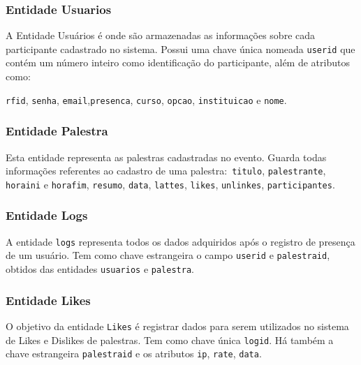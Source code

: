 \documentclass[tcc,capa]{texufpel}
\begin{document}
        \subsubsection{Entidade Usuarios}
        
            A Entidade Usuários é onde são armazenadas as informações sobre cada participante cadastrado no sistema. Possui uma chave única nomeada \texttt{user\underline{\hspace{.10in}}id} que contém um número inteiro como identificação do participante, além de atributos como:

            \texttt{rfid},
            \texttt{senha}, \texttt{email},\texttt{presenca},
            \texttt{curso}, \texttt{opcao}, \texttt{instituicao} e \texttt{nome}.

        
        \subsubsection{Entidade Palestra}
        
            Esta entidade representa as palestras cadastradas no evento. Guarda todas informações referentes ao cadastro de uma palestra:\texttt{ titulo}, \texttt{palestrante}, \texttt{horaini} e \texttt{horafim}, \texttt{resumo}, \texttt{data}, \texttt{lattes}, \texttt{likes}, \texttt{unlinkes}, \texttt{participantes}.
        
        \subsubsection{Entidade Logs}
            A entidade \texttt{logs} representa todos os dados adquiridos após o registro de presença de um usuário. Tem como chave estrangeira o campo \texttt{user\underline{\hspace{.10in}}id} e \texttt{palestra\underline{\hspace{.10in}}id}, obtidos das entidades \texttt{usuarios} e \texttt{palestra}. 
        
        \subsubsection{Entidade Likes}
            O objetivo da entidade \texttt{Likes} é registrar dados para serem utilizados no sistema de Likes e Dislikes de palestras. Tem como chave única \texttt{log\underline{\hspace{.10in}}id}.  Há também a chave estrangeira  \texttt{palestra\underline{\hspace{.10in}}id} e os atributos  \texttt{ip},  \texttt{rate},  \texttt{data}.
        
\end{document}
